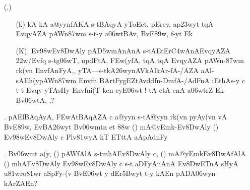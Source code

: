 \begin{itemize}
\item[({\dn \dnnum \rn{14}}.)]\begin{itemize}
                
                \item[({\dn k})] {\dn kA kA a@yynfAKA s\2-tBAqyA yToEct, pErcy, ap\?\323wyt t\?qA\2 EvqyAZA\2 pAWn\387wm\? s\2-t-y a\306wtBA\0v, BvE\389w, f-yt\? Ek}
                
                \item[({\dn K}).]{\dn  Ev\398wEv\38DwAly\? pA\3D5wmAnAnA\2 s\2-tAEtEr\3C4wAnA\2\break EvqyAZA\2 \322w\?/Evf\?q\? s\2-tg\5\306wT\4, updFtA, \3FEw(y\2fA, t\?qA\2 t\?qA\2 EvqyAZA\2 pAWn{\rs -\re}\387wm\? rk(v\?n Env\?fAnFyA,{\rs ,\re} yTA{\rs ---\re}s\2-tkA\326wynAVkAl\2kAr{\rs -\re}fA-/AZA aAl{\rs -\re}\break sAEh(ypAWn\387wm\? Env\?fn BArtFygEZtAv\?{\qvb}d\?{\rs -\re}df\0n{\rs -\re}\-Dm\0fA-/AdFnA iEt\-hAs-y c t\? t\? Evqy\? yTAs\2Hy\2 Env\?fni(T\2 k\?cn cyE\306wt {\rs !\re} tA etA\2 cnA a\306wtr\?Z Ek\2 Bv\306wtA, \5,{\rs ?\re}}
              \end{itemize}
              
 \item[{\dn\dnnum \rn{15}}.]  {\dn pAElBAqAyA, \3FEwAtBAqAZA\2 c a@yyn\2 s\2-tA@yyn\2 rk(v\?n pyA\0y(v\?n vA BvE\389w, EvBA\326wyt Bv\306wmt\?n et\? \388w\? {\rs (\re}{\dn\dnnum {}}{\rs )\re} mA@yEmk{\rs -\re}Ev\38DwAly\? {\rs (\re}{\dn \dnnum {}}{\rs )\re} Ev\398wEv\38DwAly\? c Plv\381wyA kT\2 ETttA\2 aApAdnFy} 
 
 \item[{\dn\dnnum \rn{16}}.] {\dn Bv\306wmt a(y{\rs ,\re} {\rs (\re}{\dn \dnnum {}}{\rs )\re} pAWfAlA s\2-tmhAEv\38DwAly\? c{\rs ,\re} {\rs (\re}{\dn \dnnum {}}{\rs )\re} mA@yEmkEv\38DwAfAlA {\rs (\re}{\dn\dnnum {}}{\rs )\re} mhAEv\38DwAly\? Ev\398wEv\38DwAly\? c s\2-t aDFyAnAnA\2 Ev\38DwET\0nA\2 s\2HyA\2 u\381wro\381wr aSpFy-(v\2 BvE\306wt y dEr\35Bwyt\?{\rs ,\re} t-y kAEn pADA\306wy\?n kArZAEn{\rs ?\re}}
 

\end{itemize}
